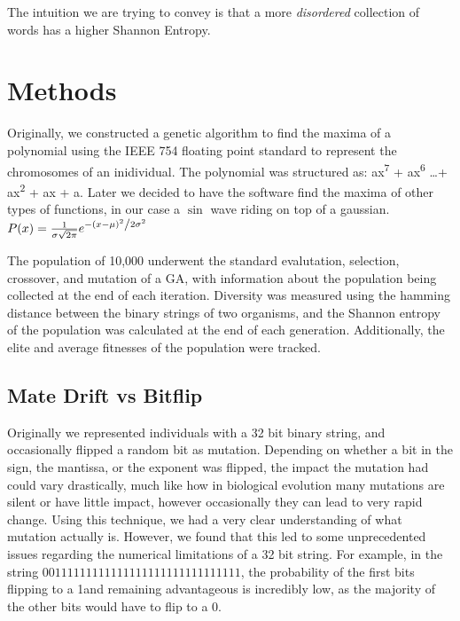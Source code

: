 \documentclass[11pt]{article}
\begin{document}
The intuition we are trying to convey is that a more \emph{disordered}
collection of words has a higher Shannon Entropy.


\section{Methods}

Originally, we constructed a genetic algorithm to find the maxima of a
polynomial using the IEEE 754 floating point standard to represent the
chromosomes of an inidividual. The polynomial was structured as:
ax\textsuperscript{7} + ax\textsuperscript{6} \ldots +
ax\textsuperscript{2} + ax + a. Later we decided to have the software
find the maxima of other types of functions, in our case a $\sin$ wave
riding on top of a gaussian. $ P(x) = \frac{1}{{\sigma \sqrt {2\pi }
}} e^{{{ - \left( {x - \mu} \right)^2 } \mathord{\left/ {\vphantom {{
            - \left( {x - \mu } \right)^2 } {2\sigma ^2 }}}
      \right. \kern-\nulldelimiterspace} {2\sigma ^2 }}} $

The population of 10,000 underwent the standard evalutation,
selection, crossover, and mutation of a GA, with information about the
population being collected at the end of each iteration. Diversity was
measured using the hamming distance between the binary strings of two
organisms, and the Shannon entropy of the population was calculated at
the end of each generation.  Additionally, the elite and average
fitnesses of the population were tracked.

\subsection{Mate Drift vs Bitflip}

Originally we represented individuals with a 32 bit binary string, and
occasionally flipped a random bit as mutation. Depending on whether a
bit in the sign, the mantissa, or the exponent was flipped, the impact
the mutation had could vary drastically, much like how in biological
evolution many mutations are silent or have little impact, however
occasionally they can lead to very rapid change. Using this technique,
we had a very clear understanding of what mutation actually
is. However, we found that this led to some unprecedented issues
regarding the numerical limitations of a 32 bit string. For example,
in the string $0 01111111 11111111111111111111111$, the probability of
the first bits flipping to a 1and remaining advantageous is incredibly
low, as the majority of the other bits would have to flip to a 0.
\end{document}
